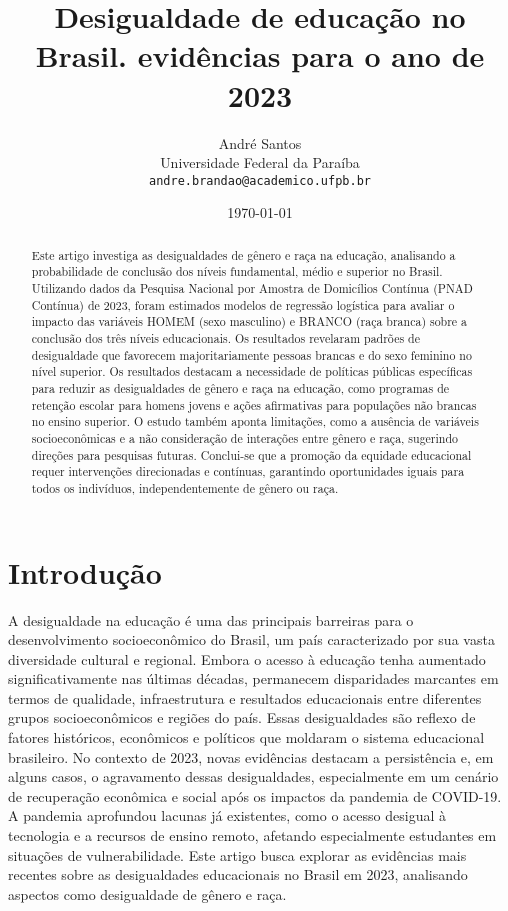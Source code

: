 \documentclass[a4paper,12pt]{article}
\title{Desigualdade de educação no Brasil. evidências para o ano de 2023}
\author{André Santos\\
    \small{Universidade Federal da Paraíba} \\
    \small{\texttt{andre.brandao@academico.ufpb.br}}
}
\date{\today}
\begin{document}
\maketitle  %

\begin{abstract}
    Este artigo investiga as desigualdades de gênero e raça na educação, analisando a probabilidade de conclusão dos níveis fundamental, médio e superior no Brasil. Utilizando dados da Pesquisa Nacional por Amostra de Domicílios Contínua (PNAD Contínua) de 2023, foram estimados modelos de regressão logística para avaliar o impacto das variáveis HOMEM (sexo masculino) e BRANCO (raça branca) sobre a conclusão dos três níveis educacionais. Os resultados revelaram padrões de desigualdade que favorecem majoritariamente pessoas brancas e do sexo feminino no nível superior.
    Os resultados destacam a necessidade de políticas públicas específicas para reduzir as desigualdades de gênero e raça na educação, como programas de retenção escolar para homens jovens e ações afirmativas para populações não brancas no ensino superior. O estudo também aponta limitações, como a ausência de variáveis socioeconômicas e a não consideração de interações entre gênero e raça, sugerindo direções para pesquisas futuras. Conclui-se que a promoção da equidade educacional requer intervenções direcionadas e contínuas, garantindo oportunidades iguais para todos os indivíduos, independentemente de gênero ou raça.

\end{abstract}

\section{Introdução}
A desigualdade na educação é uma das principais barreiras para o desenvolvimento socioeconômico do Brasil, um país caracterizado por sua vasta diversidade cultural e regional. Embora o acesso à educação tenha aumentado significativamente nas últimas décadas, permanecem disparidades marcantes em termos de qualidade, infraestrutura e resultados educacionais entre diferentes grupos socioeconômicos e regiões do país. Essas desigualdades são reflexo de fatores históricos, econômicos e políticos que moldaram o sistema educacional brasileiro.
No contexto de 2023, novas evidências destacam a persistência e, em alguns casos, o agravamento dessas desigualdades, especialmente em um cenário de recuperação econômica e social após os impactos da pandemia de COVID-19. A pandemia aprofundou lacunas já existentes, como o acesso desigual à tecnologia e a recursos de ensino remoto, afetando especialmente estudantes em situações de vulnerabilidade.
Este artigo busca explorar as evidências mais recentes sobre as desigualdades educacionais no Brasil em 2023, analisando aspectos como desigualdade de gênero e raça. 
\end{document}
